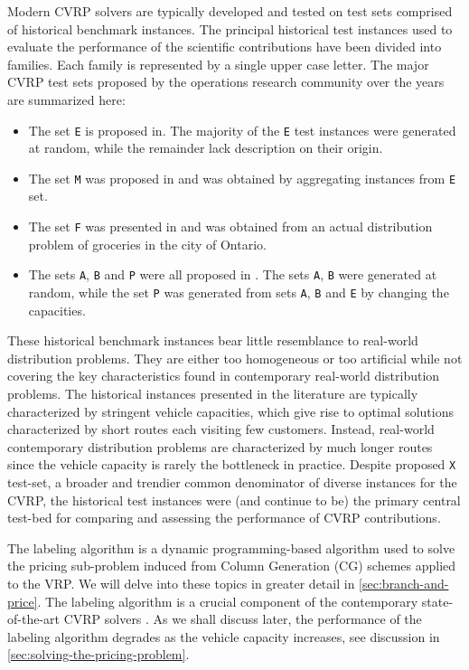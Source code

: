 Modern CVRP solvers are typically developed and tested on test sets comprised of historical benchmark instances.
The principal historical test instances used to evaluate the performance of the scientific contributions have been divided into families.
Each family is represented by a single upper case letter.
The major CVRP test sets proposed by the operations research community over the years are summarized here:
\begin{itemize}
	\setlength{\itemsep}{0pt}
	\setlength{\parskip}{0pt}

	\item The set \texttt{E} is proposed in\textcite{dantzig1959, christofides1969, gaskell1967bases, gillett1974heuristic}.
	      The majority of the \texttt{E} test instances were generated at random, while the remainder lack description on their origin.
	\item The set \texttt{M} was proposed in \textcite{christofides1979vehicle} and was obtained by aggregating instances from \texttt{E} set.
	\item The set \texttt{F} was presented in \textcite{fisher1994} and was obtained from an actual distribution problem of groceries in the city of Ontario.
	\item The sets \texttt{A}, \texttt{B} and \texttt{P} were all proposed in \textcite{augerat1995}.
	      The sets \texttt{A}, \texttt{B} were generated at random, while the set \texttt{P} was generated from sets \texttt{A}, \texttt{B} and \texttt{E} by changing the capacities.
\end{itemize}
These historical benchmark instances bear little resemblance to real-world distribution problems.
They are either too homogeneous or too artificial while not covering the key characteristics found in contemporary real-world distribution problems.
The historical instances presented in the literature are typically characterized by stringent vehicle capacities, which give rise to optimal solutions characterized by short routes each visiting few customers.
Instead, real-world contemporary distribution problems are characterized by much longer routes since the vehicle capacity is rarely the bottleneck in practice.
Despite \textcite{uchoa2017} proposed \texttt{X} test-set, a broader and trendier common denominator of diverse instances for the CVRP, the historical test instances were (and continue to be) the primary central test-bed for comparing and assessing the performance of CVRP contributions.

The labeling algorithm is a dynamic programming-based algorithm used to solve the pricing sub-problem induced from Column Generation (CG) schemes applied to the VRP.
We will delve into these topics in greater detail in \cref{sec:branch-and-price}.
The labeling algorithm is a crucial component of the contemporary state-of-the-art CVRP solvers \parencite{gutierrez-jarpa2010, archetti2011, bettinelli2011, contardo2014, contardo2015, pecin2017new, pecin2017improved, pessoa2020generic}.
As we shall discuss later, the performance of the labeling algorithm degrades as the vehicle capacity increases, see discussion in \cref{sec:solving-the-pricing-problem}.

